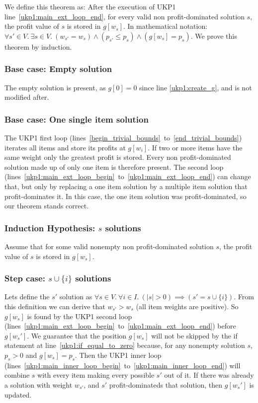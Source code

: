 \documentclass[12pt]{article}
\begin{document}
We define this theorem as: After the execution of UKP1 line~\ref{ukp1:main_ext_loop_end}, for every valid non profit-dominated solution \(s\), the profit value of \(s\) is stored in \(g[w_s]\). In mathematical notation: \(\forall s' \in V.~\exists s \in V.~(w_{s'} = w_s) \land (p_{s'} \leq p_s) \land (g[w_s] = p_s)\). We prove this theorem by induction.

\subsubsection{Base case: Empty solution}

The empty solution is present, as \(g[0] = 0\) since line \ref{ukp1:create_g}, and is not modified after.

\subsubsection{Base case: One single item solution}

The UKP1 first loop (lines~\ref{begin_trivial_bounds}~to~\ref{end_trivial_bounds}) iterates all items and store its profits at \(g[w_i]\). If two or more items have the same weight only the greatest profit is stored. Every non profit-dominated solution made up of only one item is therefore present. The second loop (lines~\ref{ukp1:main_ext_loop_begin}~to~\ref{ukp1:main_ext_loop_end}) can change that, but only by replacing a one item solution by a multiple item solution that profit-dominates it. In this case, the one item solution was profit-dominated, so our theorem stands correct.

\subsubsection{Induction Hypothesis: \(s\) solutions}

Assume that for some valid nonempty non profit-dominated solution \(s\), the profit value of \(s\) is stored in \(g[w_s]\).

\subsubsection{Step case: \(s \cup \{i\}\) solutions}

Lets define the \(s'\) solution as \(\forall s \in V.~\forall i \in I.~(|s| > 0) \implies (s' = s \cup \{i\})\). From this definition we can derive that \(w_{s'} > w_s\) (all item weights are positive). So \(g[w_s]\) is found by the UKP1 second loop (lines~\ref{ukp1:main_ext_loop_begin}~to~\ref{ukp1:main_ext_loop_end}) before \(g[w_s']\). We guarantee that the position \(g[w_s]\) will not be skipped by the if statement at line~\ref{ukp1:if_equal_to_zero} because, for any nonempty solution \(s\), \(p_s > 0\) and \(g[w_s] = p_s\). Then the UKP1 inner loop (lines~\ref{ukp1:main_inner_loop_begin}~to~\ref{ukp1:main_inner_loop_end}) will combine \(s\) with every item making every possible \(s'\) out of it. If there was already a solution with weight \(w_{s'}\), and \(s'\) profit-dominateds that solution, then \(g[w_s']\) is updated.
\end{document}
